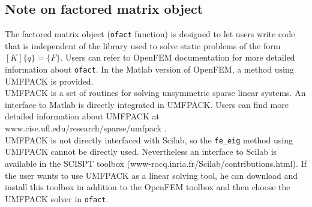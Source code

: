 \subsection{Note on factored matrix object}
The factored matrix object (\verb+ofact+ function) is designed to let users write code that is independent of the library used to solve static problems of the form $[K]\{q\}=\{F\}$. Users can refer to OpenFEM documentation for more detailed information about \verb+ofact+. In the Matlab version of OpenFEM, a method using UMFPACK is provided.\\
UMFPACK is a set of routines for solving unsymmetric sparse linear systems. An interface to Matlab is directly integrated in UMFPACK. Users can find more detailed information about UMFPACK at www.cise.ufl.edu/research/sparse/umfpack .\\
UMFPACK is not directly interfaced with Scilab, so the \verb+fe_eig+ method using UMFPACK cannot be directly used. Nevertheless an interface to Scilab is available in the SCISPT toolbox (www-rocq.inria.fr/Scilab/contributions.html). If the user wants to use UMFPACK as a linear solving tool, he can download and install this toolbox in addition to the OpenFEM toolbox and then choose the UMFPACK solver in \verb+ofact+.

